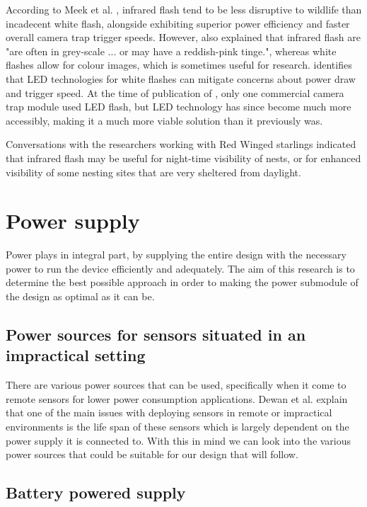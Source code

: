\documentclass[class=report,11pt,crop=false]{standalone}
\begin{document}
According to Meek et al. \cite{meek2012introduction}, infrared flash tend to be less disruptive to wildlife than incadecent white flash, alongside exhibiting superior power efficiency and faster overall camera trap trigger speeds. However, \cite{meek2012introduction} also explained that infrared flash are "are often in grey-scale ... or may have a
reddish-pink tinge.", whereas white flashes allow for colour images, which is sometimes useful for research. \cite{meek2012introduction} identifies that LED technologies for white flashes can mitigate concerns about power draw and trigger speed. At the time of publication of \cite{meek2012introduction}, only one commercial camera trap module used LED flash, but LED technology has since become much more accessibly, making it a much more viable solution than it previously was.

Conversations with the researchers working with Red Winged starlings \cite{hofmeyer2024private} indicated that infrared flash may be useful for night-time visibility of nests, or for enhanced visibility of some nesting sites that are very sheltered from daylight.


\section{Power supply}


Power plays in integral part, by supplying the entire design with the necessary power to run the device efficiently and adequately. The aim of this research is to determine the best possible approach in order to making the power submodule of the design as optimal as it can be.

\subsection{Power sources for sensors situated in an impractical setting}

There are various power sources that can be used, specifically when it come to remote sensors for lower power consumption applications. Dewan et al. \cite{dewan2014alternative} explain that one of the main issues with deploying sensors in remote or impractical environments is the life span of these sensors which is largely dependent on the power supply it is connected to. With this in mind we can look into the various power sources that could be suitable for our design that will follow.

\subsection{Battery powered supply}
\end{document}
